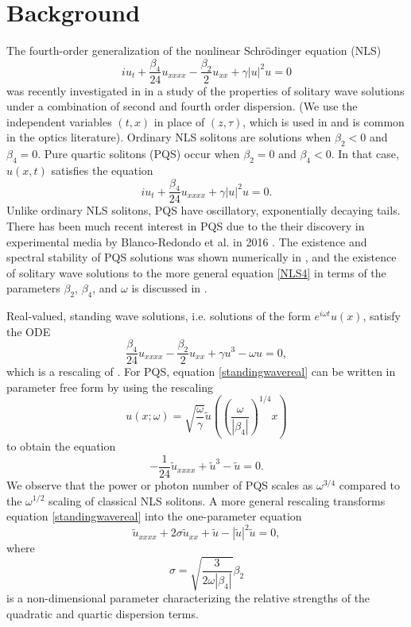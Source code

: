 \documentclass[12pt]{elsarticle}
\begin{document}
\section{Background}

The fourth-order generalization of the nonlinear Schr{\"o}dinger equation (NLS)
\begin{equation}\label{NLS4}
i u_t + \frac{\beta_4}{24}u_{xxxx} - \frac{\beta_2}{2}u_{xx} + \gamma |u|^2 u = 0
\end{equation}
was recently investigated in \cite{Tam2020} in a study of the properties of solitary wave solutions under a combination of second and fourth order dispersion. (We use the independent variables $(t, x)$ in place of $(z, \tau)$, which is used in \cite{BlancoPQS,Tam2019,Tam2020} and is common in the optics literature). Ordinary NLS solitons are solutions when $\beta_2 < 0$ and $\beta_4 = 0$. Pure quartic solitons (PQS) occur when $\beta_2 = 0$ and $\beta_4 < 0$. In that case, $u(x,t)$ satisfies the equation
\begin{equation}\label{PQSeq}
i u_t + \frac{\beta_4}{24}u_{xxxx} + \gamma |u|^2 u = 0.
\end{equation}
Unlike ordinary NLS solitons, PQS have oscillatory, exponentially decaying tails. There has been much recent interest in PQS due to the their discovery in experimental media by Blanco-Redondo et al. in 2016 \cite{BlancoPQS}. The existence and spectral stability of PQS solutions was shown numerically in \cite{Tam2019}, and the existence of solitary wave solutions to the more general equation \cref{NLS4} in terms of the parameters $\beta_2$, $\beta_4$, and $\omega$ is discussed in \cite{Tam2020}.

Real-valued, standing wave solutions, i.e. solutions of the form $e^{i \omega t} u(x)$, satisfy the ODE 
\begin{equation}\label{standingwavereal}
\frac{\beta_4}{24}u_{xxxx} - \frac{\beta_2}{2}u_{xx} + \gamma u^3 - \omega u = 0,
\end{equation}
which is a rescaling of \cite[(7)]{champneys1998}. For PQS, equation \cref{standingwavereal} can be written in parameter free form by using the rescaling 
\[
u(x; \omega) = \sqrt{\frac{\omega}{\gamma}} \tilde{u}
\left( \left(\frac{\omega}{|\beta_4|}\right)^{1/4}x \right)
\]
to obtain the equation
\begin{equation}\label{PQSparfree}
-\frac{1}{24}\tilde{u}_{xxxx} + \tilde{u}^3 - \tilde{u} = 0.
\end{equation}
We observe that the power or photon number of PQS scales as $\omega^{3/4}$ compared to the $\omega^{1/2}$ scaling of classical NLS solitons. A more general rescaling \cite[Section VI]{Tam2020} transforms equation \cref{standingwavereal} into the one-parameter equation
\begin{equation}\label{NLS4onepar}
\tilde{u}_{xxxx} + 2 \sigma \tilde{u}_{xx} +  \tilde{u} - |\tilde{u}|^2 \tilde{u} = 0,
\end{equation}
where 
\[
\sigma = \sqrt{\frac{3}{2 \omega |\beta_4| }}\beta_2
\]
is a non-dimensional parameter characterizing the relative strengths of the quadratic and quartic dispersion terms.
\end{document}
